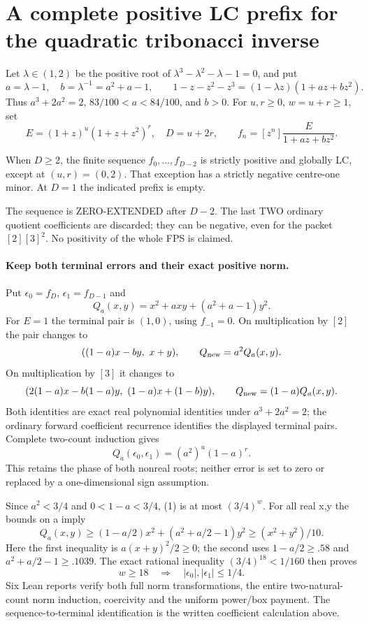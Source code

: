 \section{A complete positive LC prefix for the quadratic tribonacci inverse}
Let $\lambda\in(1,2)$ be the positive root of
$\lambda^3-\lambda^2-\lambda-1=0$, and put
\[
 a=\lambda-1,\quad b=\lambda^{-1}=a^2+a-1,\qquad
 1-z-z^2-z^3=(1-\lambda z)(1+az+bz^2).
\]
Thus $a^3+2a^2=2$, $83/100<a<84/100$, and $b>0$.
For $u,r\ge0$, $w=u+r\ge1$, set
\[
 E=(1+z)^u(1+z+z^2)^r,\quad D=u+2r,\qquad
 f_n=[z^n]\frac{E}{1+az+bz^2}.
\]
\begin{theorem}
When $D\ge2$, the finite sequence $f_0,\ldots,f_{D-2}$ is
strictly positive and globally LC, except at $(u,r)=(0,2)$.
That exception has a strictly negative centre-one minor.
At $D=1$ the indicated prefix is empty.
\end{theorem}
The sequence is ZERO-EXTENDED after $D-2$. The last TWO ordinary
quotient coefficients are discarded; they can be negative, even
for the packet $[2][3]^2$. No positivity of the whole FPS is claimed.

\paragraph{Keep both terminal errors and their exact positive norm.}
Put $\epsilon_0=f_D$, $\epsilon_1=f_{D-1}$ and
\[
 Q_a(x,y)=x^2+axy+(a^2+a-1)y^2.
\]
For $E=1$ the terminal pair is $(1,0)$, using $f_{-1}=0$.
On multiplication by $[2]$ the pair changes to
\[
       ((1-a)x-by,\ x+y),\qquad Q_{\rm new}=a^2Q_a(x,y).
\]
On multiplication by $[3]$ it changes to
\[
 (2(1-a)x-b(1-a)y,\ (1-a)x+(1-b)y),
                  \qquad Q_{\rm new}=(1-a)Q_a(x,y).
\]
Both identities are exact real polynomial identities under
$a^3+2a^2=2$; the ordinary forward coefficient recurrence identifies
the displayed terminal pairs. Complete two-count induction gives
\[
             Q_a(\epsilon_0,\epsilon_1)
                              =(a^2)^u(1-a)^r.            \tag{1}
\]
This retains the phase of both nonreal roots; neither error is set
to zero or replaced by a one-dimensional sign assumption.

Since $a^2<3/4$ and $0<1-a<3/4$, (1) is at most $(3/4)^w$.
For all real x,y the bounds on a imply
\[
 Q_a(x,y)\ge(1-a/2)x^2+(a^2+a/2-1)y^2
                                      \ge(x^2+y^2)/10.
\]
Here the first inequality is $a(x+y)^2/2\ge0$; the second uses
$1-a/2\ge.58$ and $a^2+a/2-1\ge.1039$.
The exact rational inequality $(3/4)^{18}<1/160$ then proves
\[
        w\ge18\quad\Longrightarrow\quad
                       |\epsilon_0|,|\epsilon_1|\le1/4. \tag{2}
\]
Six Lean reports verify both full norm transformations, the entire
two-natural-count norm induction, coercivity and the uniform power/box
payment. The sequence-to-terminal identification is the written
coefficient calculation above.

